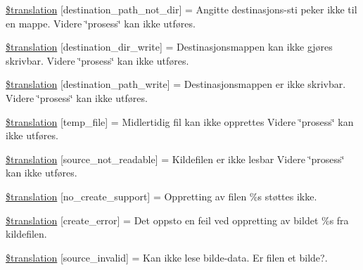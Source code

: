 \begin{DoxyCompactItemize}
\item 
\hyperlink{class_8upload_8no___n_o_8php_a5704a67137126e8c87b7a364175929d4}{\$translation} \mbox{[}\textquotesingle{}destination\+\_\+path\+\_\+not\+\_\+dir\textquotesingle{}\mbox{]} = \textquotesingle{}Angitte destinasjons-\/sti peker ikke til en mappe. Videre \char`\"{}prosess\char`\"{} kan ikke utføres.\textquotesingle{}
\item 
\hyperlink{class_8upload_8no___n_o_8php_a97608ea194a616db49141a0e6dee900c}{\$translation} \mbox{[}\textquotesingle{}destination\+\_\+dir\+\_\+write\textquotesingle{}\mbox{]} = \textquotesingle{}Destinasjonsmappen kan ikke gjøres skrivbar. Videre \char`\"{}prosess\char`\"{} kan ikke utføres.\textquotesingle{}
\item 
\hyperlink{class_8upload_8no___n_o_8php_a40e4e1962226b89fd76da5819a9602b0}{\$translation} \mbox{[}\textquotesingle{}destination\+\_\+path\+\_\+write\textquotesingle{}\mbox{]} = \textquotesingle{}Destinasjonsmappen er ikke skrivbar. Videre \char`\"{}prosess\char`\"{} kan ikke utføres.\textquotesingle{}
\item 
\hyperlink{class_8upload_8no___n_o_8php_a2baece8da11e20d45175db91851ec3e3}{\$translation} \mbox{[}\textquotesingle{}temp\+\_\+file\textquotesingle{}\mbox{]} = \textquotesingle{}Midlertidig fil kan ikke opprettes Videre \char`\"{}prosess\char`\"{} kan ikke utføres.\textquotesingle{}
\item 
\hyperlink{class_8upload_8no___n_o_8php_a922967ca2df0efdd455261142d8e5715}{\$translation} \mbox{[}\textquotesingle{}source\+\_\+not\+\_\+readable\textquotesingle{}\mbox{]} = \textquotesingle{}Kildefilen er ikke lesbar Videre \char`\"{}prosess\char`\"{} kan ikke utføres.\textquotesingle{}
\item 
\hyperlink{class_8upload_8no___n_o_8php_a346dfd1ade29f583dd20d345c436859f}{\$translation} \mbox{[}\textquotesingle{}no\+\_\+create\+\_\+support\textquotesingle{}\mbox{]} = \textquotesingle{}Oppretting av filen \%s støttes ikke.\textquotesingle{}
\item 
\hyperlink{class_8upload_8no___n_o_8php_a53013ce9255c4e1849098ddd9fdb2b3f}{\$translation} \mbox{[}\textquotesingle{}create\+\_\+error\textquotesingle{}\mbox{]} = \textquotesingle{}Det oppsto en feil ved oppretting av bildet \%s fra kildefilen.\textquotesingle{}
\item 
\hyperlink{class_8upload_8no___n_o_8php_a6ab0a660b457eaf2d3434b225449fdd6}{\$translation} \mbox{[}\textquotesingle{}source\+\_\+invalid\textquotesingle{}\mbox{]} = \textquotesingle{}Kan ikke lese bilde-\/data. Er filen et bilde?.\textquotesingle{}

\end{DoxyCompactItemize}

